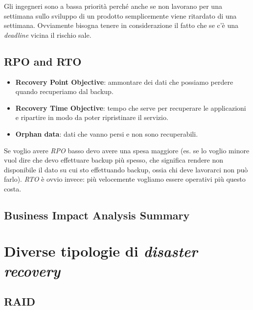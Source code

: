 
Gli ingegneri sono a bassa priorità perché anche se non lavorano per una 
settimana sullo sviluppo di un prodotto semplicemente viene ritardato di una 
settimana. Ovviamente bisogna tenere in considerazione il fatto che se c'è una 
\textit{deadline} vicina il rischio sale.

\subsection{RPO and RTO}

\begin{itemize}
 \item \textbf{Recovery Point Objective}: ammontare dei dati che possiamo 
perdere quando recuperiamo dal backup.

 \item \textbf{Recovery Time Objective}: tempo che serve per recuperare le 
applicazioni e ripartire in modo da poter ripristinare il servizio.

 \item \textbf{Orphan data}: dati che vanno persi e non sono recuperabili.
\end{itemize}

Se voglio avere \textit{RPO} basso devo avere una spesa maggiore (es. se lo 
voglio minore vuol dire che devo effettuare backup più spesso, che significa 
rendere non disponibile il dato su cui sto effettuando backup, ossia chi deve 
lavorarci non può farlo).
\textit{RTO} è ovvio invece: più velocemente vogliamo essere operativi più 
questo costa.

\subsection{Business Impact Analysis Summary}


\section{Diverse tipologie di \textit{disaster recovery}}

\subsection{RAID}

